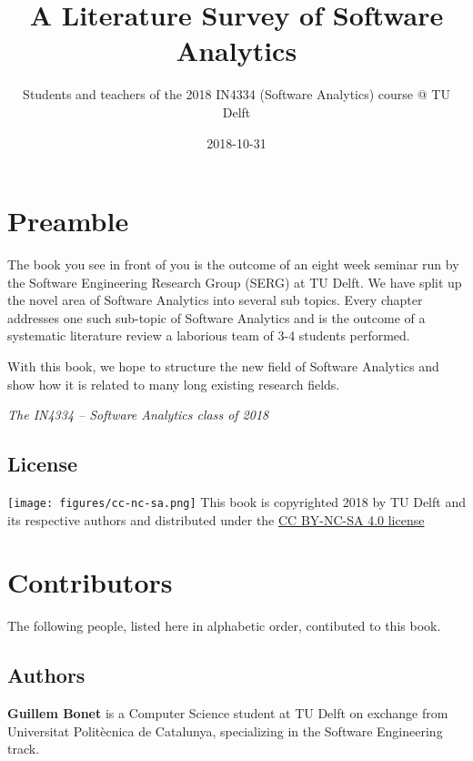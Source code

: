 \documentclass[]{book}
\title{A Literature Survey of Software Analytics}
\author{Students and teachers of the 2018 IN4334 (Software Analytics) course @
TU Delft}
\date{2018-10-31}
\begin{document}
\maketitle

{
\hypersetup{linkcolor=black}
\setcounter{tocdepth}{1}
\tableofcontents
}
\chapter*{Preamble}\label{intro}

The book you see in front of you is the outcome of an eight week seminar
run by the Software Engineering Research Group (SERG) at TU Delft. We
have split up the novel area of Software Analytics into several sub
topics. Every chapter addresses one such sub-topic of Software Analytics
and is the outcome of a systematic literature review a laborious team of
3-4 students performed.

With this book, we hope to structure the new field of Software Analytics
and show how it is related to many long existing research fields.

\emph{The IN4334 -- Software Analytics class of 2018}

\section*{License}\label{license}

\texttt{[image: figures/cc-nc-sa.png]} This book is copyrighted 2018 by
TU Delft and its respective authors and distributed under the
\href{https://creativecommons.org/licenses/by-nc-sa/4.0/}{CC BY-NC-SA
4.0 license}

\chapter*{Contributors}\label{contributors}

The following people, listed here in alphabetic order, contibuted to
this book.

\section*{Authors}\label{authors}

\textbf{Guillem Bonet} is a Computer Science student at TU Delft on
exchange from Universitat Politècnica de Catalunya, specializing in the
Software Engineering track.
\end{document}

